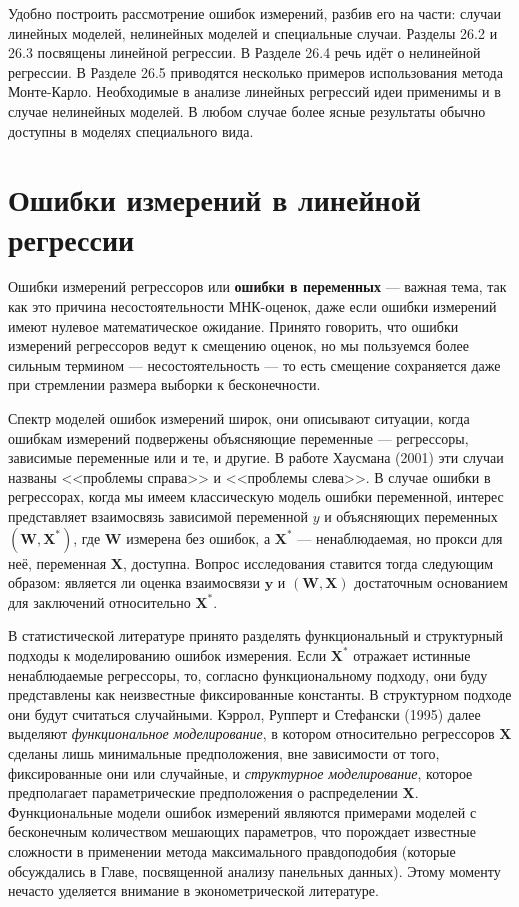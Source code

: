 Удобно построить рассмотрение ошибок измерений, разбив его на части: случаи линейных моделей, нелинейных моделей и специальные случаи. Разделы 26.2 и 26.3 посвящены линейной регрессии. В Разделе 26.4 речь идёт о нелинейной регрессии. В Разделе 26.5 приводятся несколько примеров использования метода Монте-Карло.  Необходимые в анализе линейных регрессий идеи применимы и в случае нелинейных моделей. В любом случае более ясные результаты обычно доступны в моделях специального вида.

\section{Ошибки измерений в линейной регрессии}

Ошибки измерений регрессоров или {\bf ошибки в переменных}  --- важная тема, так как это причина несостоятельности МНК-оценок, даже если ошибки измерений имеют нулевое математическое ожидание. Принято говорить, что ошибки измерений регрессоров ведут к смещению оценок, но мы пользуемся более сильным термином --- несостоятельность --- то есть смещение сохраняется даже при стремлении размера выборки к бесконечности.

Спектр моделей ошибок измерений широк, они описывают ситуации, когда ошибкам измерений подвержены объясняющие переменные --- регрессоры, зависимые переменные или и те, и другие. В работе Хаусмана (2001) эти случаи названы <<проблемы справа>> и <<проблемы слева>>. В случае ошибки в регрессорах, когда мы имеем классическую модель ошибки переменной,  интерес представляет взаимосвязь зависимой переменной $y$ и объясняющих переменных $(\mathbf{W}, \mathbf{X^*})$, где $\mathbf{W}$ измерена без ошибок, а $\mathbf{X^*}$ --- ненаблюдаемая, но прокси для неё, переменная $\mathbf{X}$, доступна. Вопрос исследования ставится тогда следующим образом: является ли оценка взаимосвязи $\mathbf{y}$ и $(\mathbf{W}, \mathbf{X})$ достаточным основанием для заключений относительно $\mathbf{X^*}$.


В статистической литературе  принято разделять  функциональный и структурный подходы к моделированию ошибок измерения. Если $\mathbf{X^*}$ отражает истинные ненаблюдаемые регрессоры, то, согласно функциональному подходу, они буду представлены как неизвестные фиксированные константы. В структурном подходе они будут считаться случайными. Кэррол, Рупперт и Стефански (1995) далее выделяют \emph{функциональное моделирование}, в котором относительно регрессоров $\mathbf{X}$ сделаны лишь минимальные предположения, вне зависимости от того, фиксированные они или случайные, и \emph{структурное моделирование}, которое предполагает параметрические предположения о распределении $\mathbf{X}$. Функциональные модели ошибок измерений являются примерами моделей с бесконечным количеством мешающих параметров, что порождает известные сложности в применении метода максимального правдоподобия (которые обсуждались в Главе, посвященной анализу панельных данных). Этому моменту нечасто уделяется внимание в эконометрической литературе.

